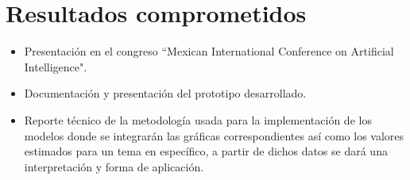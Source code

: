 \section {Resultados comprometidos}
\begin{itemize}
\item Presentación en el congreso ``Mexican International Conference on Artificial Intelligence".
\item Documentación y presentación del prototipo desarrollado.
\item Reporte técnico de la metodología usada para la implementación de los modelos donde se integrarán las gráficas correspondientes así como los valores estimados para un tema en específico, a partir de dichos datos se dará una interpretación y forma de aplicación.
\end{itemize}